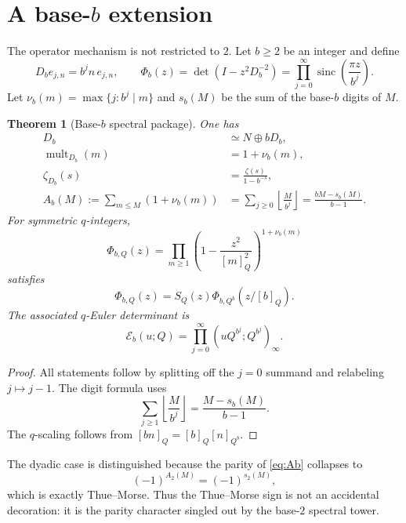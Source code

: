 \documentclass[11pt,oneside]{article}
\numberwithin{equation}{section}
\theoremstyle{plain}
\newtheorem{theorem}{Theorem}[section]
\theoremstyle{definition}
\theoremstyle{remark}
\newcommand{\sinc}{\operatorname{sinc}}
\newcommand{\Ecal}{\mathscr E}
\begin{document}
\section{A base-$b$ extension}

The operator mechanism is not restricted to $2$.  Let $b\ge2$ be an integer and define
\begin{equation}\label{eq:Db}
 D_b e_{j,n}=b^jn\,e_{j,n},
 \qquad
 \Phi_b(z)=\det(I-z^2D_b^{-2})
 =\prod_{j=0}^{\infty}\sinc\!\left(\frac{\pi z}{b^j}\right).
\end{equation}
Let $\nu_b(m)=\max\{j:b^j\mid m\}$ and $s_b(M)$ be the sum of the base-$b$ digits of $M$.

\begin{theorem}[Base-$b$ spectral package]\label{thm:base-b}
One has
\begin{align}
 D_b&\simeq N\oplus bD_b,\label{eq:Db-scale}\\
 \operatorname{mult}_{D_b}(m)&=1+\nu_b(m),\label{eq:mb}\\
 \zeta_{D_b}(s)&=\frac{\zeta(s)}{1-b^{-s}},\label{eq:zetab}\\
 A_b(M):=\sum_{m\le M}(1+\nu_b(m))
 &=\sum_{j\ge0}\left\lfloor\frac{M}{b^j}\right\rfloor
 =\frac{bM-s_b(M)}{b-1}.\label{eq:Ab}
\end{align}
For symmetric $q$-integers,
\begin{equation}\label{eq:PhibQ}
 \Phi_{b,Q}(z)=\prod_{m\ge1}
 \left(1-\frac{z^2}{[m]_Q^2}\right)^{1+\nu_b(m)}
\end{equation}
satisfies
\begin{equation}\label{eq:PhibQ-scale}
 \Phi_{b,Q}(z)=S_Q(z)
 \Phi_{b,Q^b}\!\left(z/[b]_Q\right).
\end{equation}
The associated $q$-Euler determinant is
\begin{equation}\label{eq:Eb}
 \Ecal_b(u;Q)=\prod_{j=0}^{\infty}
 (uQ^{b^j};Q^{b^j})_\infty.
\end{equation}
\end{theorem}

\begin{proof}
All statements follow by splitting off the $j=0$ summand and relabeling $j\mapsto j-1$.  The digit formula uses
\[
 \sum_{j\ge1}\left\lfloor\frac{M}{b^j}\right\rfloor
 =\frac{M-s_b(M)}{b-1}.
\]
The $q$-scaling follows from $[bn]_Q=[b]_Q[n]_{Q^b}$.
\end{proof}

The dyadic case is distinguished because the parity of \cref{eq:Ab} collapses to
\[
 (-1)^{A_2(M)}=(-1)^{s_2(M)},
\]
which is exactly Thue--Morse.  Thus the Thue--Morse sign is not an accidental decoration: it is the parity character singled out by the base-$2$ spectral tower.
\end{document}
